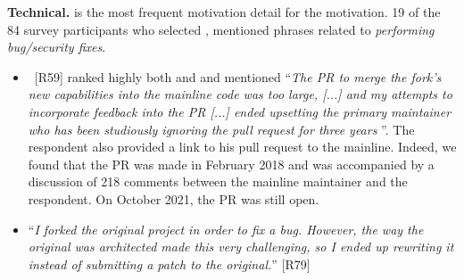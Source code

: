 \nd \textbf{Technical.}  is the most frequent motivation detail for the  motivation. 19 of the 84 survey participants who selected , mentioned phrases related to \emph{performing bug/security fixes}.

\begin{itemize}[leftmargin=*]


\item~[R59] ranked highly both  and  and mentioned ``\emph{The PR to merge the fork's new capabilities into the mainline code was too large, [...] %
and my attempts to incorporate feedback into the PR [...] %
ended upsetting the primary maintainer who has been studiously ignoring the pull request for three years \frownie{}}''. 
The respondent also provided a \gh link to his pull request to the mainline. Indeed, we found that the PR was made in February 2018 and was accompanied by a discussion of 218 comments between the mainline maintainer and the respondent. On October 2021, the PR was still open.

\item ``\emph{I forked the original project in order to fix a bug. However, the way the original was architected made this very challenging, so I ended up rewriting it instead of submitting a patch to the original.}'' [R79]


\end{itemize}

